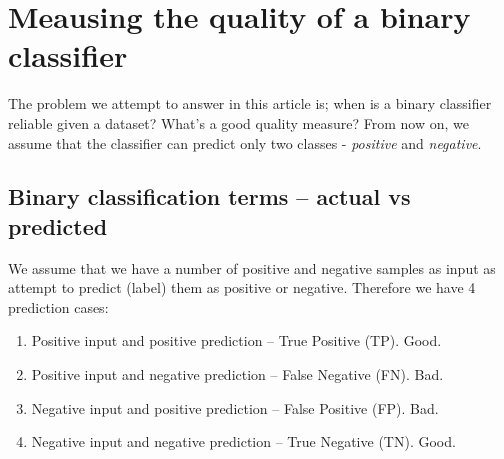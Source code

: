 \documentclass[a4paper]{article}
\begin{document}






\newpage
\tableofcontents
\newpage



\section{Meausing the quality of a binary classifier}

The problem we attempt to answer in this article is; when is a binary classifier reliable given a dataset? What's a good quality measure? From now on, we assume that the classifier can predict only two classes - \textit{positive} and \textit{negative}.

\subsection{Binary classification terms -- actual vs predicted}

We assume that we have a number of positive and negative samples as input as attempt to predict (label) them as positive or negative. Therefore we have 4 prediction cases:
\begin{enumerate}
    \item Positive input and positive prediction -- True Positive (TP). \textcolor{green!60!black}{Good}.
    \item Positive input and negative prediction -- False Negative (FN). \textcolor{red!60!black}{Bad}.
    \item Negative input and positive prediction -- False Positive (FP). \textcolor{red!60!black}{Bad}.
    \item Negative input and negative prediction -- True Negative (TN). \textcolor{green!60!black}{Good}. 
\end{enumerate}
\end{document}
